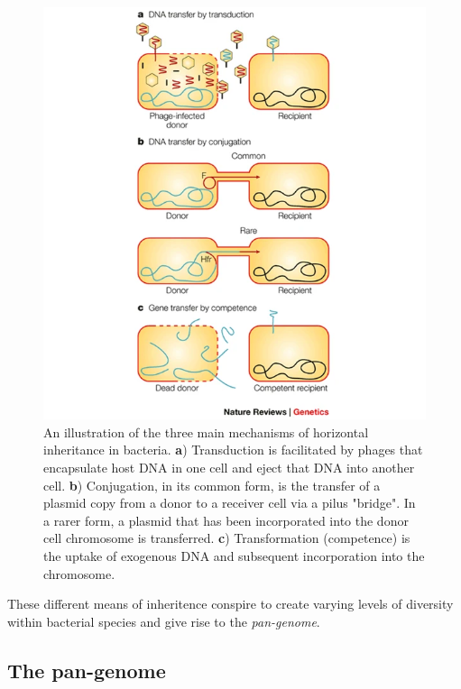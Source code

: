 \begin{figure}
\begin{center}
\includegraphics[width=0.95\columnwidth]{Chapter0/Figs/methods-of-dna-transfer.png}
\caption{{An illustration of the three main mechanisms of horizontal inheritance in bacteria. \textbf{a}) Transduction is facilitated by phages that encapsulate host DNA in one cell and eject that DNA into another cell. \textbf{b}) Conjugation, in its common form, is the transfer of a plasmid copy from a donor to a receiver cell via a pilus "bridge". In a rarer form, a plasmid that has been incorporated into the donor cell chromosome is transferred. \textbf{c}) Transformation (competence) is the uptake of exogenous DNA and subsequent incorporation into the chromosome.}
{\label{fig:horizontal-inheritance}}
}
\end{center}
\end{figure}

\noindent
These different means of inheritence conspire to create varying levels of diversity within bacterial species and give rise to the \textit{pan-genome}.

\subsection{The pan-genome}

